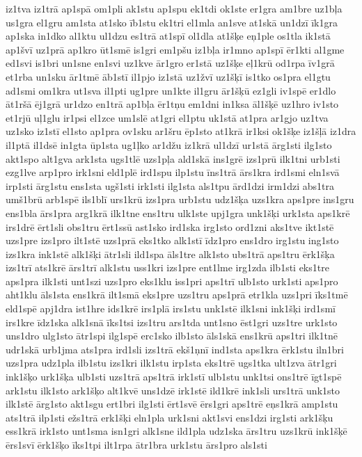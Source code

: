 {iz1tva
iz1trā
ap1spā
om1pli
ak1stu
ap1spu
ek1tdi
ok1ste
er1gra
am1bre
uz1bļa
us1gra
el1gru
am1sta
at1sko
īb1stu
ek1tri
el1mla
an1sve
at1skā
un1dzī
īk1gra
ap1ska
in1dko
al1ktu
ul1dzu
es1trā
at1spī
ol1dla
at1šķe
eņ1ple
os1tla
ik1stā
ap1švī
uz1prā
ap1kro
ūt1smē
is1gri
em1pšu
iz1bļa
ir1mno
ap1spī
ēr1kti
al1gme
ed1svi
is1bri
un1sne
en1svi
uz1kve
ār1gro
er1stā
uz1šķe
eļ1krū
od1rpa
īv1grā
et1rba
un1sku
ār1tmē
āb1stī
il1pjo
iz1stā
uz1žvī
uz1šķī
is1tko
os1pra
el1gtu
ad1smi
om1kra
ut1sva
il1pti
ug1pre
un1kte
il1gru
ār1šķū
ez1gli
iv1spē
er1dlo
āt1ršā
ēj1grā
ur1dzo
en1trā
ap1bļa
ēr1tņu
em1dni
in1ksa
āl1šķē
uz1hro
iv1sto
et1rjū
uļ1glu
ir1psi
el1zce
um1slē
at1gri
el1ptu
uk1stā
at1pra
ar1gjo
uz1tva
uz1sko
iz1stī
el1sto
ap1pra
ov1sku
ar1šru
ēp1sto
at1krā
ir1ksi
ok1šķe
iz1šļā
iz1dra
il1ptā
il1dsē
in1gta
ūp1sta
ug1ļko
ar1džu
iz1krā
ul1dzī
ur1stā
ārg1sti
ilg1sto
akt1spo
alt1gva
ark1sta
ugs1tlē
uzs1pļa
ald1skā
ins1grē
izs1prū
ilk1tni
urb1sti
ezg1lve
arp1pro
irk1sni
eld1plē
ird1spu
ilp1stu
īns1trā
ārs1kra
ird1smi
eln1svā
irp1sti
ārg1stu
ens1sta
ugš1sti
irk1sti
ilg1sta
als1tpu
ārd1dzi
irm1dzi
abs1tra
umš1brū
arb1spē
ils1blī
urs1krū
izs1pra
urb1stu
udz1šķa
uzs1kra
aps1pre
ins1gru
ens1bla
ārs1pra
arg1krā
ilk1tne
ens1tru
ulk1ste
upj1gra
unk1šķi
urk1sta
aps1krē
irs1drē
ērt1sli
obs1tru
ērt1ssū
ast1sko
ird1ska
irg1sto
ord1zni
aks1tve
ikt1stē
uzs1pre
izs1pro
ilt1stē
uzs1prā
eks1tko
alk1stī
īdz1pro
ens1dro
irg1stu
ing1sto
izs1kra
ink1stē
alk1šķi
ātr1sli
ild1spa
āls1tre
alk1sto
ubs1trā
aps1tru
ērk1šķa
izs1trī
ats1krē
ārs1trī
alk1stu
uss1kri
izs1pre
ent1lme
irg1zda
ilb1sti
eks1tre
aps1pra
ilk1sti
unt1szi
uzs1pro
eks1klu
iss1pri
aps1trī
ulb1sto
urk1sti
aps1pro
aht1klu
āls1sta
ens1krā
ilt1smā
eks1pre
uzs1tru
aps1prā
etr1kla
uzs1pri
īks1tmē
eld1spē
apj1dra
ist1hre
ids1krē
irs1plā
irs1stu
unk1stē
ilk1sni
ink1šķi
ird1smī
irs1kre
īdz1ska
alk1snā
īks1tsi
izs1tru
ars1tda
unt1sno
ēst1gri
uzs1tre
urk1sto
uns1dro
ulg1sto
ātr1spi
ilg1spē
erc1sko
ilb1sto
āls1skā
ens1krū
aps1tri
ilk1tnē
udr1skā
urb1jma
ats1pra
ird1sli
izs1trā
ekš1ņnī
ind1sta
aps1kra
ērk1stu
iln1bri
uzs1pra
udz1pla
ilb1stu
izs1kri
ilk1stu
irp1sta
eks1trē
ugs1tka
ult1zva
ātr1gri
ink1šķo
urk1šķa
ulb1sti
uzs1trā
aps1trā
irk1stī
ulb1stu
unk1tsi
ons1trē
īgt1spē
ark1stu
ilk1sto
ark1šķo
alt1kvē
uns1dzē
irk1stē
ild1krē
ink1sli
urs1trā
unk1sto
ilk1stē
ārg1sto
akt1sgu
ert1bri
ilg1sti
ērt1svē
ērs1gri
aps1trē
eņs1krā
amp1stu
ats1trā
ilp1sti
ežs1trā
erk1šķi
eln1pla
urk1sni
akt1svi
ens1dzi
irg1sti
ark1šķu
ess1krā
irk1sto
unt1sma
isn1gri
alk1sne
ild1pla
udz1ska
ārs1tru
uzs1krū
ink1šķē
ērs1svī
ērk1šķo
īks1tpi
ilt1rpa
ātr1bra
urk1stu
ārs1pro
als1sti
}
